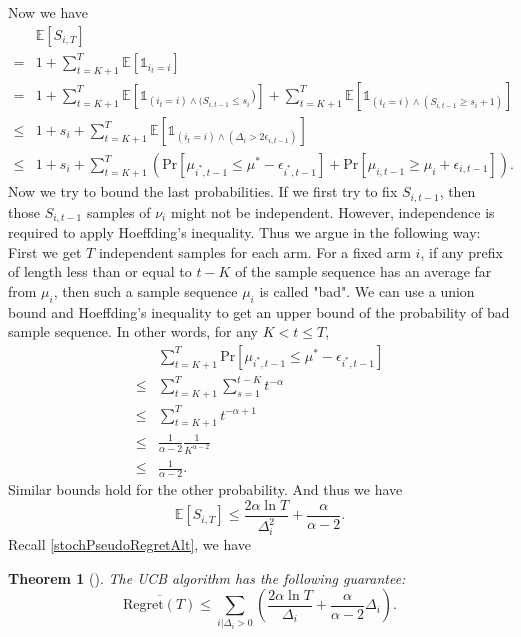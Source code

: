 \documentclass[openany]{book}
\newtheorem{theorem}{Theorem}[chapter]
\theoremstyle{definition}
\theoremstyle{remark}
\begin{document}
Now we have
\begin{equation}
    \begin{array}{cl}
         & \mathbb{E}[S_{i,T}] \\
        = & \displaystyle1+\sum_{t=K+1}^{T}\mathbb{E}[\mathds{1}_{i_t=i}] \\
        = & \displaystyle1+\sum_{t=K+1}^{T}\mathbb{E}[\mathds{1}_{(i_t=i)\wedge(S_{i,t-1}\le s_i})]+\sum_{t=K+1}^{T}\mathbb{E}[\mathds{1}_{(i_t=i)\wedge(S_{i,t-1}\ge s_i+1)}] \\
        \le & \displaystyle1+s_i+\sum_{t=K+1}^{T}\mathbb{E}[\mathds{1}_{(i_t=i)\wedge(\Delta_i>2\epsilon_{i,t-1})}] \\
        \le & \displaystyle1+s_i+\sum_{t=K+1}^{T}(\mathrm{Pr}[\mu_{i^*,t-1}\le\mu^*-\epsilon_{i^*,t-1}]+\mathrm{Pr}[\mu_{i,t-1}\ge\mu_i+\epsilon_{i,t-1}]).
    \end{array}
\end{equation}
Now we try to bound the last probabilities. If we first try to fix $S_{i,t-1}$, then those $S_{i,t-1}$ samples of $\nu_i$ might not be independent. However, independence is required to apply Hoeffding's inequality. Thus we argue in the following way: First we get $T$ independent samples for each arm. For a fixed arm $i$, if any prefix of length less than or equal to $t-K$ of the sample sequence has an average far from $\mu_i$, then such a sample sequence $\mu_i$ is called "bad". We can use a union bound and Hoeffding's inequality to get an upper bound of the probability of bad sample sequence. In other words, for any $K<t\le T$,
\begin{equation}
    \begin{array}{cl}
         & \displaystyle \sum_{t=K+1}^{T}\mathrm{Pr}[\mu_{i^*,t-1}\le\mu^*-\epsilon_{i^*,t-1}] \\
        \le & \displaystyle \sum_{t=K+1}^{T}\sum_{s=1}^{t-K}t^{-\alpha} \\
        \le & \displaystyle \sum_{t=K+1}^{T}t^{-\alpha+1} \\
        \le & \displaystyle \frac{1}{\alpha-2}\frac{1}{K^{\alpha-2}} \\
        \le & \displaystyle \frac{1}{\alpha-2}.
    \end{array}
\end{equation}
Similar bounds hold for the other probability. And thus we have
\begin{equation}
    \mathbb{E}[S_{i,T}]\le \frac{2\alpha\ln T}{\Delta_i^2}+\frac{\alpha}{\alpha-2}.
\end{equation}
Recall \eqref{stochPseudoRegretAlt}, we have
\begin{theorem}[\cite{ACF02}]\label{thm:UCBBound}
    The UCB algorithm has the following guarantee:
    \begin{equation}\label{UCBBound}
        \overline{\mathrm{Regret}(T)}\le \sum_{i|\Delta_i>0}^{}\left(\frac{2\alpha\ln T}{\Delta_i}+\frac{\alpha}{\alpha-2}\Delta_i\right).
    \end{equation}
\end{theorem}
\end{document}

